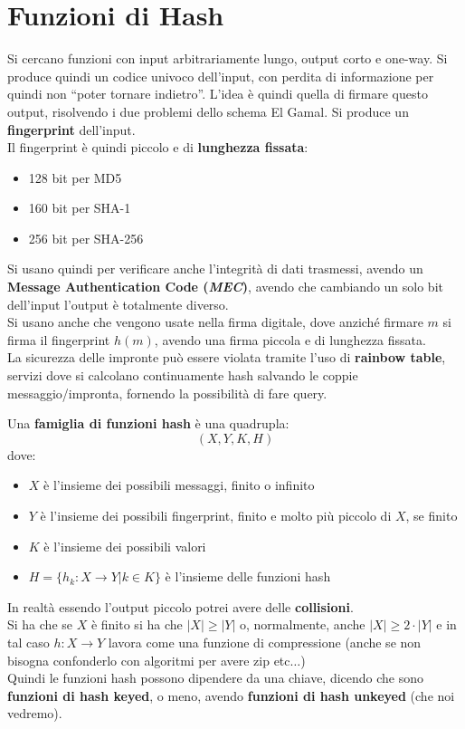 \documentclass[a4paper,12pt, oneside]{book}
\begin{document}
\section{Funzioni di Hash}
Si cercano funzioni con input arbitrariamente lungo, output corto e one-way. Si
produce quindi un codice univoco dell'input, con 
perdita di informazione per quindi non ``poter tornare indietro''. L'idea è
quindi quella di firmare questo output, risolvendo i due problemi dello schema
El Gamal. Si produce un \textbf{fingerprint} dell'input.\\
Il fingerprint è quindi piccolo e di \textbf{lunghezza fissata}:
\begin{itemize}
  \item 128 bit per MD5
  \item 160 bit per SHA-1
  \item 256 bit per SHA-256
\end{itemize}
Si usano quindi per verificare anche l'integrità di dati trasmessi, avendo un
\textbf{Message Authentication Code (\textit{MEC})}, avendo che cambiando un
solo bit dell'input l'output è totalmente diverso.\\
Si usano anche che vengono usate nella firma digitale, dove anziché firmare $m$
si firma il fingerprint $h(m)$, avendo una firma piccola e di lunghezza
fissata.\\
La sicurezza delle impronte può essere violata tramite l'uso di \textbf{rainbow
  table}, servizi dove si calcolano continuamente hash salvando le coppie
messaggio/impronta, fornendo la possibilità di fare query.
\begin{definizione}
  Una \textbf{famiglia di funzioni hash} è una quadrupla:
  \[(X,Y,K,H)\]
  dove:
  \begin{itemize}
    \item $X$ è l'insieme dei possibili messaggi, finito o infinito
    \item $Y$ è l'insieme dei possibili fingerprint, finito e molto più piccolo
    di $X$, se finito
    \item $K$ è l'insieme dei possibili valori 
    \item $H=\{h_k:X\to Y|k\in K\}$ è l'insieme delle funzioni hash
  \end{itemize}
  In realtà essendo l'output piccolo potrei avere delle \textbf{collisioni}. \\
  Si ha che se $X$ è finito si ha che $|X|\geq |Y|$ o, normalmente, anche
  $|X|\geq 2\cdot|Y|$ e in tal caso $h:X\to Y$ lavora come una funzione di
  compressione (anche se non bisogna confonderlo con algoritmi per avere zip
  etc$\ldots$)  \\ 
  Quindi le funzioni hash possono dipendere da una chiave, dicendo che sono
  \textbf{funzioni di hash keyed}, o meno, avendo  \textbf{funzioni di hash
    unkeyed} (che noi vedremo). 
\end{definizione}
\end{document}
